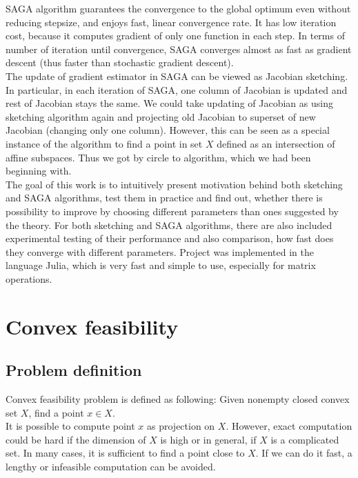 \documentclass[11pt]{book}
\begin{document}
SAGA algorithm guarantees the convergence to the global optimum even without reducing stepsize, and enjoys fast, linear convergence rate. It has low iteration cost, because it computes gradient of only one function in each step. In terms of number of iteration until convergence, SAGA converges almost as fast as gradient descent (thus faster than stochastic gradient descent).\\

The update of gradient estimator in SAGA can be viewed as Jacobian sketching. In particular, in each iteration of SAGA, one column of Jacobian is updated and rest of Jacobian stays the same. We could take updating of Jacobian as using sketching algorithm again and projecting old Jacobian to superset of new Jacobian (changing only one column). However, this can be seen as a special instance of the algorithm to find a point in set $X$ defined as an intersection of affine subspaces. Thus we got by circle to algorithm, which we had been beginning with.\\

The goal of this work is to intuitively present motivation behind both sketching and SAGA algorithms, test them in practice and find out, whether there is possibility to improve by choosing different parameters than ones suggested by the theory. For both sketching and SAGA algorithms, there are also included experimental testing of their performance and also comparison, how fast does they converge with different parameters. Project was implemented in the language Julia, which is very fast and simple to use, especially for matrix operations.

\chapter{Convex feasibility}

\section{Problem definition}

Convex feasibility problem is defined as following: Given nonempty closed convex set $X$, find a point $x \in X.$\\

It is possible to compute point $x$ as projection on $X$. However, exact computation could be hard if the dimension of $X$ is high or in general, if $X$ is a complicated set. In many cases, it is sufficient to find a point close to $X$. If we can do it fast, a lengthy or infeasible computation can be avoided.\\
\end{document}
